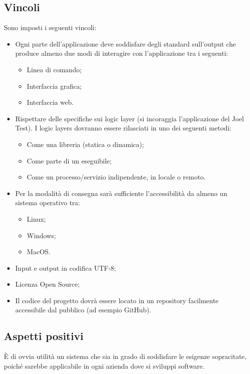 \subsection{Vincoli}
Sono imposti i seguenti vincoli:
\begin{itemize}
\item Ogni parte dell'applicazione deve soddisfare degli standard sull'output che produce almeno due modi di interagire con l'applicazione tra i seguenti:
\begin{itemize}
\item Linea di comando;
\item Interfaccia grafica;
\item Interfaccia web.
\end{itemize}

\item Rispettare delle specifiche sui logic layer (si incoraggia l'applicazione del Joel Test). I logic layers dovranno essere rilasciati in uno dei seguenti metodi:
\begin{itemize}
\item Come una libreria (statica o dinamica);
\item Come parte di un eseguibile;
\item Come un processo/servizio indipendente, in locale o remoto.
\end{itemize}

\item Per la modalità di consegna sarà sufficiente l'accessibilità da almeno un sistema operativo tra:
\begin{itemize}
\item Linux;
\item Windows;
\item MacOS.
\end{itemize}

\item Input e output in codifica UTF-8;
\item Licenza Open Source;
\item Il codice del progetto dovrà essere locato in un repository facilmente accessibile dal pubblico (ad esempio GitHub).
\end{itemize}

\subsection{Aspetti positivi}
È di ovvia utilità un sistema che sia in grado di soddisfare le esigenze sopracitate, poiché sarebbe applicabile in ogni azienda dove si sviluppi software.

